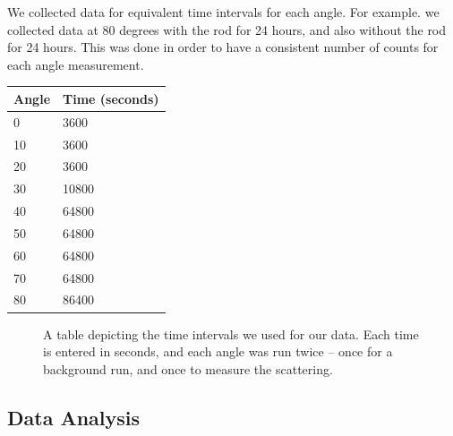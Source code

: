 \documentclass[10pt,letterpaper,onecolumn]{article}
\begin{document}
We collected data for equivalent time intervals for each angle. For example. we collected data at 80 degrees with the rod for 24 hours, and also without the rod for 24 hours. This was done in order to have a consistent number of counts for each angle measurement. 

\begin{table}[tbp]
    \centering
    \begin{tabular}{ll}
    Angle                    & Time (seconds)             \\ \hline
    \multicolumn{1}{|l|}{0}  & \multicolumn{1}{l|}{3600}  \\ \hline
    \multicolumn{1}{|l|}{10} & \multicolumn{1}{l|}{3600}  \\ \hline
    \multicolumn{1}{|l|}{20} & \multicolumn{1}{l|}{3600}  \\ \hline
    \multicolumn{1}{|l|}{30} & \multicolumn{1}{l|}{10800} \\ \hline
    \multicolumn{1}{|l|}{40} & \multicolumn{1}{l|}{64800} \\ \hline
    \multicolumn{1}{|l|}{50} & \multicolumn{1}{l|}{64800} \\ \hline
    \multicolumn{1}{|l|}{60} & \multicolumn{1}{l|}{64800} \\ \hline
    \multicolumn{1}{|l|}{70} & \multicolumn{1}{l|}{64800} \\ \hline
    \multicolumn{1}{|l|}{80} & \multicolumn{1}{l|}{86400} \\ \hline
    \end{tabular}
\end{table}
\begin{figure}
    \caption{A table depicting the time intervals we used for our data. Each time is entered in seconds, and each angle was run twice -- once for a background run, and once to measure the scattering.}
\end{figure}
\subsection{Data Analysis}
\end{document}
